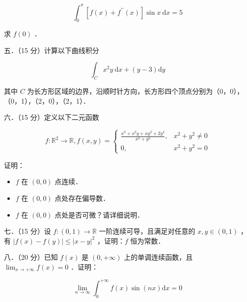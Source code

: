 \documentclass{article}
\begin{document}
\[
\int_{0}^{\pi}\left[f(x)+f^{\prime \prime}(x)\right] \sin x \mathrm{~d} x=5
\]

求 \(f(0)\) ．

五．（15 分）计算以下曲线积分

\[
\int_{C} x^{2} y \mathrm{~d} x+(y-3) \mathrm{d} y
\]

其中 \(C\) 为长方形区域的边界，沿顺时针方向，长方形四个顶点分别为（0，0），（0，1），（2，0），（2，1）．

六．（15 分）定义以下二元函数

\[
f: \mathbb{R}^{2} \rightarrow \mathbb{R}, f(x, y)= \begin{cases}\frac{x^{3}+x^{2} y+x y^{2}+2 y^{4}}{x^{2}+y^{2}}, & x^{2}+y^{2} \neq 0 \\ 0, & x^{2}+y^{2}=0\end{cases}
\]

证明：

\begin{itemize}
  \item[（1）] \(f\) 在 \((0,0)\) 点连续．
  \item[（2）] \(f\) 在 \((0,0)\) 点处存在偏导数．
  \item[（3）] \(f\) 在 \((0,0)\) 点处是否可微？请详细说明．
\end{itemize}

七．（15 分）设 \(f:(0,1) \rightarrow \mathbb{R}\) 一阶连续可导，且满足对任意的 \(x, y \in(0,1)\) ，有 \(|f(x)-f(y)| \leq|x-y|^{2}\) ，证明：\(f\) 恒为常数．

八．（20 分）已知 \(f(x)\) 是 \((0,+\infty)\) 上的单调连续函数，且 \(\lim _{x \rightarrow+\infty} f(x)=0\) ．证明：

\[
\lim _{n \rightarrow \infty} \int_{0}^{+\infty} f(x) \sin (n x) \mathrm{d} x=0
\]
\end{document}
